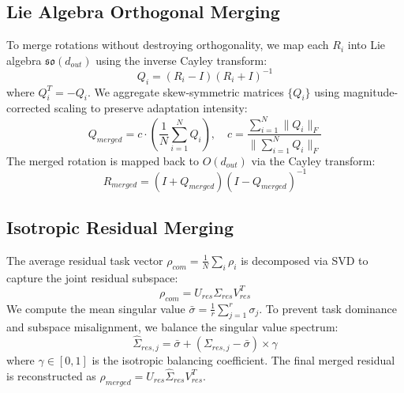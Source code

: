 \documentclass{article}
\begin{document}
\subsection{Lie Algebra Orthogonal Merging}
To merge rotations without destroying orthogonality, we map each $R_i$ into Lie algebra $\mathfrak{so}(d_{out})$ using the inverse Cayley transform:
\begin{equation}
Q_i = (R_i - I)(R_i + I)^{-1}
\end{equation}
where $Q_i^T = -Q_i$. We aggregate skew-symmetric matrices $\{Q_i\}$ using magnitude-corrected scaling to preserve adaptation intensity:
\begin{equation}
Q_{merged} = c \cdot \left(\frac{1}{N} \sum_{i=1}^N Q_i\right), \quad c = \frac{\sum_{i=1}^N \|Q_i\|_F}{\|\sum_{i=1}^N Q_i\|_F}
\end{equation}
The merged rotation is mapped back to $O(d_{out})$ via the Cayley transform:
\begin{equation}
R_{merged} = (I + Q_{merged})(I - Q_{merged})^{-1}
\end{equation}

\subsection{Isotropic Residual Merging}
The average residual task vector $\rho_{com} = \frac{1}{N} \sum_i \rho_i$ is decomposed via SVD to capture the joint residual subspace:
\begin{equation}
\rho_{com} = U_{res} \Sigma_{res} V_{res}^T
\end{equation}
We compute the mean singular value $\bar{\sigma} = \frac{1}{r} \sum_{j=1}^r \sigma_j$. To prevent task dominance and subspace misalignment, we balance the singular value spectrum:
\begin{equation}
\hat{\Sigma}_{res, j} = \bar{\sigma} + (\Sigma_{res, j} - \bar{\sigma}) \times \gamma
\end{equation}
where $\gamma \in [0, 1]$ is the isotropic balancing coefficient. The final merged residual is reconstructed as $\rho_{merged} = U_{res} \hat{\Sigma}_{res} V_{res}^T$.
\end{document}
